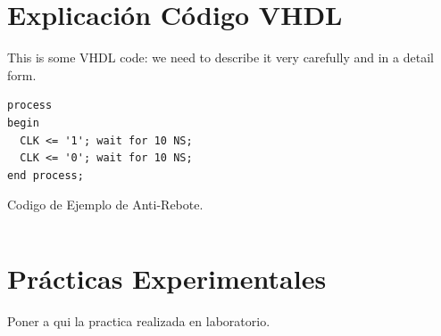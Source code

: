 \documentclass[paper=a4, fontsize=12pt]{article} 		%
\numberwithin{equation}{section}						%
\numberwithin{figure}{section} 							%
\numberwithin{table}{section} 							%
\begin{document}
\section{Explicación Código VHDL}
This is some VHDL code: we need to describe it very carefully and in a detail form.
\begin{verbatim}
process
begin
  CLK <= '1'; wait for 10 NS;
  CLK <= '0'; wait for 10 NS;
end process;
\end{verbatim}
Codigo de Ejemplo de Anti-Rebote.
\inputminted{vhdl}{./Code/debounce.vhd}

\section{Prácticas Experimentales}
Poner a qui la practica realizada en laboratorio.
\end{document}
